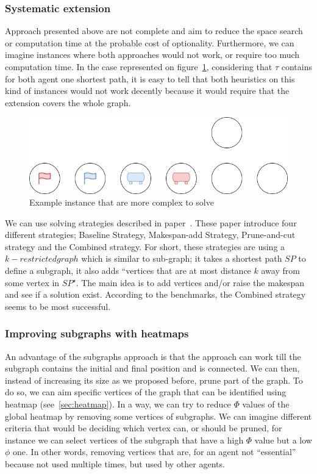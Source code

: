 \subsubsection{Systematic extension}

Approach presented above are not complete and aim to reduce the space search or computation time at the probable cost of optionality. Furthermore, we can imagine instances where both approaches would not work, or require too much computation time. In the case represented on figure~\ref{img:systemetic_instance}, considering that \(\tau\) contains for both agent one shortest path, it is easy to tell that both heuristics on this kind of instances would not work decently because it would require that the extension covers the whole graph.

\begin{figure}[H]
  \centering
  \caption{Example instance that are more complex to solve}\label{img:systemetic_instance}
  \includegraphics[width=\widthimg]{img/systematic_instance.drawio.png}
\end{figure}

We can use solving strategies described in paper~\cite{husvobbass22a,husvobbass22b}. These paper introduce four different strategies; Baseline Strategy, Makespan-add Strategy, Prune-and-cut strategy and the Combined strategy. For short, these strategies are using a \(k-restricted graph\) which is similar to sub-graph; it takes a shortest path \(SP\) to define a subgraph, it also adds ``vertices that are at most distance \(k\) away from some vertex in \(SP\)". The main idea is to add vertices and/or raise the makespan and see if a solution exist. According to the benchmarks, the Combined strategy seems to be most successful.

\subsubsection{Improving subgraphs with heatmaps}

An advantage of the subgraphs approach is that the approach can work till the subgraph contains the initial and final position and is connected. We can then, instead of increasing its size as we proposed before, prune part of the graph. To do so, we can aim specific vertices of the graph that can be identified using heatmap (see~\ref{sec:heatmap}). In a way, we can try to reduce \(\Phi\) values of the global heatmap by removing some vertices of subgraphs. We can imagine different criteria that would be deciding which vertex can, or should be pruned, for instance we can select vertices of the subgraph that have a high \(\Phi\) value but a low \(\phi\) one. In other words, removing vertices that are, for an agent not ``essential'' because not used multiple times, but used by other agents. 

